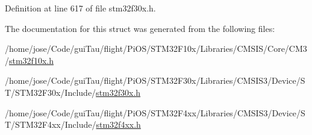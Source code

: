 Definition at line 617 of file stm32f30x.\-h.



The documentation for this struct was generated from the following files\-:\begin{DoxyCompactItemize}
\item 
/home/jose/\-Code/gui\-Tau/flight/\-Pi\-O\-S/\-S\-T\-M32\-F10x/\-Libraries/\-C\-M\-S\-I\-S/\-Core/\-C\-M3/\hyperlink{stm32f10x_8h}{stm32f10x.\-h}\item 
/home/jose/\-Code/gui\-Tau/flight/\-Pi\-O\-S/\-S\-T\-M32\-F30x/\-Libraries/\-C\-M\-S\-I\-S3/\-Device/\-S\-T/\-S\-T\-M32\-F30x/\-Include/\hyperlink{stm32f30x_8h}{stm32f30x.\-h}\item 
/home/jose/\-Code/gui\-Tau/flight/\-Pi\-O\-S/\-S\-T\-M32\-F4xx/\-Libraries/\-C\-M\-S\-I\-S3/\-Device/\-S\-T/\-S\-T\-M32\-F4xx/\-Include/\hyperlink{stm32f4xx_8h}{stm32f4xx.\-h}\end{DoxyCompactItemize}
